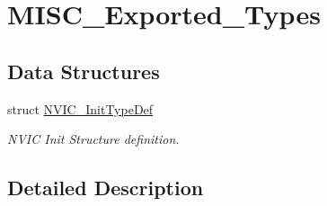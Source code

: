 \hypertarget{group___m_i_s_c___exported___types}{\section{M\-I\-S\-C\-\_\-\-Exported\-\_\-\-Types}
\label{group___m_i_s_c___exported___types}
}
\subsection*{Data Structures}
\begin{DoxyCompactItemize}
\item 
struct \hyperlink{struct_n_v_i_c___init_type_def}{N\-V\-I\-C\-\_\-\-Init\-Type\-Def}
\begin{DoxyCompactList}\small\item\em N\-V\-I\-C Init Structure definition. \end{DoxyCompactList}\end{DoxyCompactItemize}


\subsection{Detailed Description}
